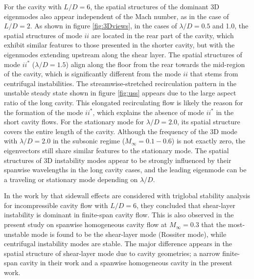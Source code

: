 \documentclass{jfm}
\begin{document}
For the cavity with $L/D=6$, the spatial structures of the dominant 3D eigenmodes also appear independent of the Mach number, as in the case of $L/D=2$. As shown in figure \ref{fig:3Dviews}, in the cases of $\lambda/D=0.5$ and 1.0, the spatial structures of mode $ii$ are located in the rear part of the cavity, which exhibit similar features to those presented in the shorter cavity, but with the eigenmodes extending upstream along the shear layer. The spatial structures of mode $ii^*$ ($\lambda/D=1.5$) align along the floor from the rear towards the mid-region of the cavity, which is significantly different from the mode $ii$ that stems from centrifugal instabilities. The streamwise-stretched recirculation pattern in the unstable steady state shown in figure \ref{fig:uss} appears due to the large aspect ratio of the long cavity. This elongated recirculating flow is likely the reason for the formation of the mode $ii^*$, which explains the absence of mode $ii^*$ in the short cavity flows. For the stationary mode for $\lambda/D=2.0$, its spatial structure covers the entire length of the cavity. Although the frequency of the 3D mode with $\lambda/D=2.0$ in the subsonic regime ($M_\infty=0.1-0.6$) is not exactly zero, the eigenvectors still share similar features to the stationary mode. The spatial structures of 3D instability modes appear to be strongly influenced by their spanwise wavelengths in the long cavity cases, and the leading eigenmode can be a traveling or stationary mode depending on $\lambda/D$. 

In the work by \cite{Liu:JFM16} that sidewall effects are considered with triglobal stability analysis for incompressible cavity flow with $L/D=6$, they concluded that shear-layer instability is dominant in finite-span cavity flow. This is also observed in the present study on spanwise homogeneous cavity flow at $M_\infty=0.3$ that the most-unstable mode is found to be the shear-layer mode (Rossiter mode), while centrifugal instability modes are stable. The major difference appears in the spatial structure of shear-layer mode due to cavity geometries; a narrow finite-span cavity in their work and a spanwise homogeneous cavity in the present work.
\end{document}
